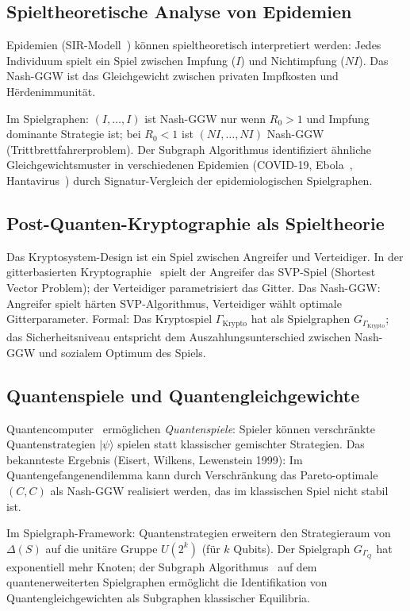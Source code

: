 ﻿\documentclass[a4paper,12pt]{article}
\theoremstyle{definition}
\begin{document}
\subsection{Spieltheoretische Analyse von Epidemien}

Epidemien (SIR-Modell~\cite{epp2026r0}) k\"onnen spieltheoretisch interpretiert
werden: Jedes Individuum spielt ein Spiel zwischen Impfung ($I$) und
Nichtimpfung ($NI$). Das Nash-GGW ist das Gleichgewicht zwischen
privaten Impfkosten und H\"{e}rdenimmunit\"at.

Im Spielgraphen: $(I, \ldots, I)$ ist Nash-GGW nur wenn $R_0 > 1$
und Impfung dominante Strategie ist; bei $R_0 < 1$ ist $(NI, \ldots, NI)$
Nash-GGW (Trittbrettfahrerproblem).
Der Subgraph Algorithmus identifiziert \"ahnliche Gleichgewichtsmuster
in verschiedenen Epidemien (COVID-19, Ebola~\cite{epp2026ebola},
Hantavirus~\cite{epp2026hantavirus}) durch Signatur-Vergleich der
epidemiologischen Spielgraphen.

\subsection{Post-Quanten-Kryptographie als Spieltheorie}

Das Kryptosystem-Design ist ein Spiel zwischen Angreifer und Verteidiger.
In der gitterbasierten Kryptographie~\cite{epp2026lattice} spielt der
Angreifer das SVP-Spiel (Shortest Vector Problem); der Verteidiger
parametrisiert das Gitter.
Das Nash-GGW: Angreifer spielt h\"arten SVP-Algorithmus, Verteidiger w\"ahlt
optimale Gitterparameter.
Formal: Das Kryptospiel $\Gamma_{\mathrm{Krypto}}$ hat als Spielgraphen
$G_{\Gamma_{\mathrm{Krypto}}}$; das Sicherheitsniveau entspricht dem
Auszahlungsunterschied zwischen Nash-GGW und sozialem Optimum des Spiels.

\subsection{Quantenspiele und Quantengleichgewichte}

Quantencomputer~\cite{epp2026quantum} erm\"oglichen \emph{Quantenspiele}:
Spieler k\"onnen verschr\"ankte Quantenstrategien $|\psi\rangle$ spielen statt
klassischer gemischter Strategien.
Das bekannteste Ergebnis (Eisert, Wilkens, Lewenstein 1999): Im
Quantengefangenendilemma kann durch Verschr\"ankung das Pareto-optimale
$(C,C)$ als Nash-GGW realisiert werden, das im klassischen Spiel nicht stabil ist.

Im Spielgraph-Framework: Quantenstrategien erweitern den Strategieraum
von $\Delta(S)$ auf die unit\"are Gruppe $U(2^k)$ (f\"ur $k$ Qubits).
Der Spielgraph $G_{\Gamma_Q}$ hat exponentiell mehr Knoten;
der Subgraph Algorithmus~\cite{epp2026subgraph} auf dem quantenerweiterten
Spielgraphen erm\"oglicht die Identifikation von Quantengleichgewichten als
Subgraphen klassischer Equilibria.
\end{document}
